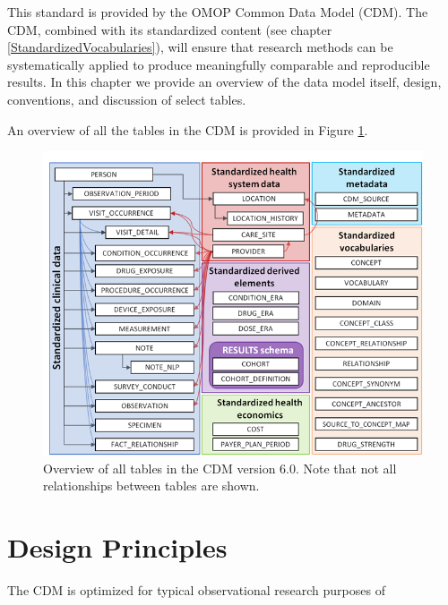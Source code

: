 \documentclass[11pt]{book}
\theoremstyle{definition}
\theoremstyle{definition}
\theoremstyle{definition}
\theoremstyle{remark}
\begin{document}
This standard is provided by the OMOP Common Data Model (CDM). The CDM, combined with its standardized content (see chapter \ref{StandardizedVocabularies}), will ensure that research methods can be systematically applied to produce meaningfully comparable and reproducible results. In this chapter we provide an overview of the data model itself, design, conventions, and discussion of select tables.

An overview of all the tables in the CDM is provided in Figure \ref{fig:cdmDiagram}. 

\begin{figure}
\includegraphics[width=1\linewidth]{images/CommonDataModel/cdmDiagram} \caption{Overview of all tables in the CDM version 6.0. Note that not all relationships between tables are shown.}\label{fig:cdmDiagram}
\end{figure}

\hypertarget{design-principles}{%
\section{Design Principles}\label{design-principles}}

The CDM is optimized for typical observational research purposes of 
\end{document}
